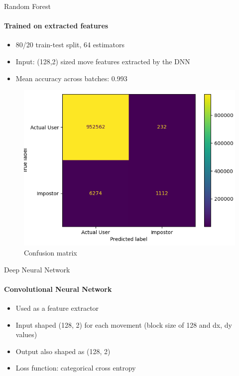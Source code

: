 \documentclass{beamer}
\begin{document}
\begin{frame}{Random Forest}
\framesubtitle{Trained on extracted features}
\begin{itemize}
    \item 80/20 train-test split, 64 estimators
    \item Input: (128,2) sized move features extracted by the DNN
    \item Mean accuracy across batches: 0.993
\end{itemize}

\begin{figure}
    \centering
    \includegraphics[width = .5\textwidth]{theme/images/confusion_matrix_cnn.png}
    \caption{Confusion matrix}
    \label{fig:confusion_matrix_rf_cnn}
\end{figure}

\end{frame}

\begin{frame}{Deep Neural Network}
\framesubtitle{Convolutional Neural Network}
    \begin{itemize}
        \item Used as a feature extractor
        \item Input shaped (128, 2) for each movement (block size of 128 and dx, dy values)
        \item Output also shaped as (128, 2)
        \item Loss function: categorical cross entropy
    \end{itemize}
    \begin{table}[!ht]
    \centering
    \caption{Hyperparameters for training feature extractor.}
    \label{tab:feature-extractor}
    \end{table}
\end{frame}
\end{document}
